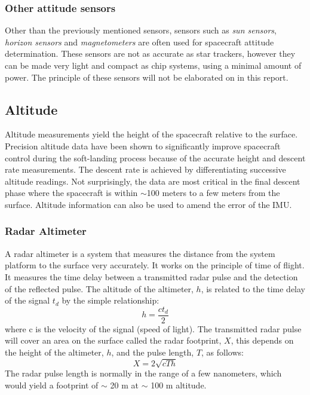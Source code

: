 \subsubsection{Other attitude sensors}
Other than the previously mentioned sensors, sensors such as \textit{sun sensors}, \textit{horizon sensors} and \textit{magnetometers} are often used for spacecraft attitude determination. These sensors are not as accurate as star trackers, however they can be made very light and compact as chip systems, using a minimal amount of power. The principle of these sensors will not be elaborated on in this report. 


\subsection{Altitude}
Altitude measurements yield the height of the spacecraft relative to the surface. Precision altitude data have been shown to significantly improve spacecraft control during the soft-landing process because of the accurate height and descent rate measurements. The descent rate is achieved by differentiating successive altitude readings. Not surprisingly, the data are most critical in the final descent phase where the spacecraft is within $\sim$100 meters to a few meters from the surface. Altitude information can also be used to amend the error of the IMU. 


\subsubsection{Radar Altimeter}
A radar altimeter is a system that measures the distance from the system platform to the surface very accurately. It works on the principle of time of flight. It measures the time delay between a transmitted radar pulse and the detection of the reflected pulse. The altitude of the altimeter, $h$, is related to the time delay of the signal $t_d$ by the simple relationship:
\begin{equation}
h=\dfrac{c t_d}{2}
\end{equation}
where c is the velocity of the signal (speed of light)\cite{henningalt}. The transmitted radar pulse will cover an area on the surface called the radar footprint, $X$, this depends on the height of the altimeter, $h$, and the pulse length, $T$, as follows:
\begin{equation}
X=2\sqrt{cTh}
\end{equation}
The radar pulse length is normally in the range of a few nanometers, which would yield a footprint of $\sim$ 20 m at $\sim$ 100 m altitude. 

